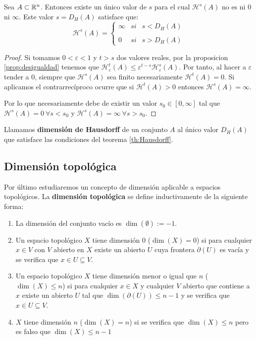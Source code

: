 \begin{teorema}
\label{th:Hausdorff}
Sea $A\subset \mathbb{R}^n$. Entonces existe un único valor de $s$ para el cual $\mathcal{H}^s(A)$ no es ni $0$ ni $\infty$. Este valor $s=D_H(A)$ satisface que:
\begin{equation}
\mathcal H^s(A)= \left\{ \begin{array}{lcc}
             \infty &   si  & s < D_H(A) \\
             \\ 0 &  si & s > D_H(A) 
             \end{array}
   \right.
\end{equation}
\end{teorema} 
\begin{proof}
  Si tomamos $0<\varepsilon<1$ y $t>s$ dos valores reales, por la proposicion \ref{prop:desigualdad} tenemos que $\mathcal{H}_\varepsilon^t(A)\leq \varepsilon^{t-s}\mathcal{H}_\varepsilon^s(A)$. Por tanto, al hacer a $\varepsilon$ tender a $0$, siempre que $\mathcal{H}^s(A)$ sea finito necesariamente $\mathcal{H}^t(A)=0$. Si aplicamos el contrarrecíproco ocurre que si $\mathcal{H}^t(A)>0$ entonces $\mathcal{H}^s(A)=\infty$.

  Por lo que necesariamente debe de existir un valor $s_0\in[0,\infty]$ tal que $\mathcal{H}^s(A)=0 \ \forall s<s_0$ y $\mathcal{H}^s(A)=\infty \ \forall s>s_0$.
\end{proof}
\begin{definicion}
Llamamos \textbf{dimensión de Hausdorff} de un conjunto $A$ al único valor $D_H(A)$ que satisface las condiciones del teorema \ref{th:Hausdorff}.
\end{definicion}

\subsection{Dimensión topológica}

Por último estudiaremos un concepto de dimensión aplicable a espacios topológicos. La \textbf{dimensión topológica} se define inductivamente de la siguiente forma:

\begin{enumerate}
\item La dimensión del conjunto vacío es $\dim(\emptyset):=-1$.
\item Un espacio topológico $X$ tiene dimensión 0 ($\dim(X)=0$) si para cualquier $x\in V$ con $V$ abierto en $X$ existe un abierto $U$ cuya frontera $\partial(U)$ es vacía y se verifica que $x\in U\subseteq V$.

\item Un espacio topológico $X$ tiene dimensión menor o igual que $n$ ($\dim(X)\leq n$) si para cualquier $x\in X$ y cualquier $V$ abierto que contiene a $x$ existe un abierto $U$ tal que $\dim(\partial(U))\leq n-1$ y se verifica que $x\in U\subseteq V$. 

\item $X$ tiene dimensión $n$ ($\dim(X)=n$) si se verifica que $\dim(X)\leq n$ pero es falso que $\dim(X)\leq n-1$
\end{enumerate}

